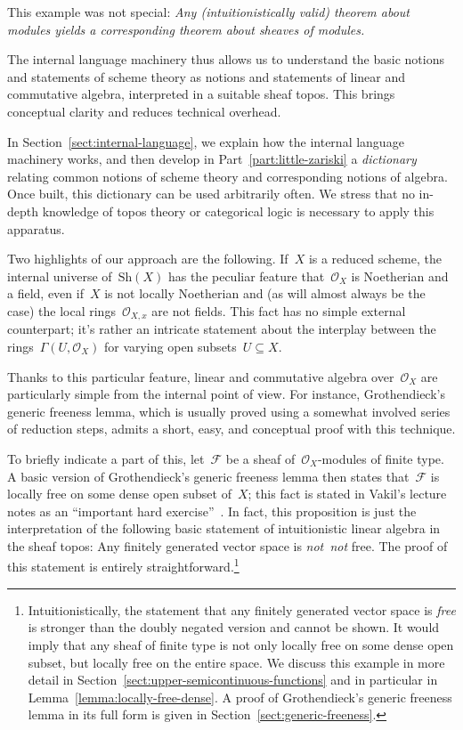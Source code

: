 \documentclass[10pt,reqno,a4paper]{amsbook}
\theoremstyle{definition}
\theoremstyle{plain}
\theoremstyle{remark}
\newcommand{\F}{\mathcal{F}}
\renewcommand{\O}{\mathcal{O}}
\newcommand{\Sh}{\mathrm{Sh}}
\newcommand{\?}{\,{:}\,}
\renewcommand{\_}{\mathpunct{.}\,}
\newcommand{\notnot}{\emph{not~not}\xspace}
\begin{document}
{This example was not special: \emph{Any (intuitionistically valid) theorem
about modules yields a corresponding theorem about sheaves of modules.}

The internal language machinery thus allows us to understand the basic notions
and statements of scheme theory as notions and statements of linear and
commutative algebra, interpreted in a suitable sheaf topos. This brings
conceptual clarity and reduces technical overhead.

In Section~\ref{sect:internal-language}, we explain how the internal language
machinery works, and then develop in Part~\ref{part:little-zariski} a
\emph{dictionary} relating common notions of scheme theory and corresponding
notions of algebra. Once built, this dictionary can be used arbitrarily often.
We stress that no in-depth knowledge of topos theory or categorical logic is
necessary to apply this apparatus.

Two highlights of our approach are the following. If~$X$ is a reduced scheme,
the internal universe of~$\Sh(X)$ has the peculiar feature that~$\O_X$ is
Noetherian and a field, even if~$X$ is not locally Noetherian and (as will
almost always be the case) the local rings~$\O_{X,x}$ are not fields. This fact
has no simple external counterpart; it's rather an intricate statement about
the interplay between the rings~$\Gamma(U, \O_X)$ for varying open subsets~$U
\subseteq X$.

Thanks to this particular feature, linear and commutative algebra over~$\O_X$
are particularly simple from the
internal point of view. For instance, Grothendieck's generic freeness lemma,
which is usually proved using a somewhat involved series of reduction steps,
admits a short, easy, and conceptual proof with this technique.

To briefly indicate a part of this, let~$\F$ be a sheaf of~$\O_X$-modules of finite
type. A basic version of Grothendieck's generic freeness lemma then states
that~$\F$ is locally free on some dense open subset of~$X$; this fact
is stated in Vakil's lecture notes as an ``important hard
exercise''~\cite[Exercise~13.7.K]{vakil:foag}. In fact, this proposition is just the
interpretation of the following basic statement of intuitionistic linear algebra in
the sheaf topos: Any finitely generated vector space is \notnot free.
The proof of this statement is entirely straightforward.\footnote{Intuitionistically,
the statement that any finitely generated vector space is \emph{free} is stronger than
the doubly negated version and cannot be shown. It would imply that any sheaf
of finite type is not only locally free on some dense open subset, but locally
free on the entire space. We discuss this example in more detail in
Section~\ref{sect:upper-semicontinuous-functions} and in particular in
Lemma~\ref{lemma:locally-free-dense}. A proof of Grothendieck's generic
freeness lemma in its full form is given in
Section~\ref{sect:generic-freeness}.

}}
\end{document}
